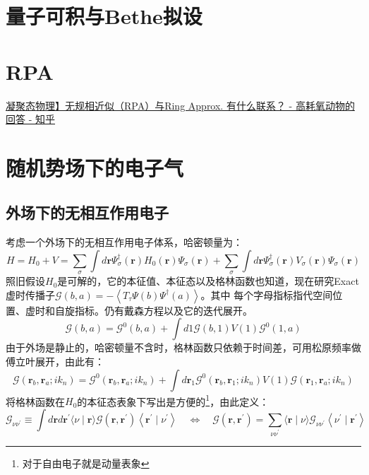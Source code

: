 \documentclass[10pt,openany]{book}
\theoremstyle{thmstyle} %
\theoremstyle{defstyle} %
\theoremstyle{prostyle} %
\begin{document}
\section{量子可积与Bethe拟设}

\section{RPA}
\href{https://www.zhihu.com/question/384993011/answer/3030775169}{凝聚态物理】无规相近似（RPA）与Ring Approx. 有什么联系？ - 高耗氧动物的回答 - 知乎}
\section{随机势场下的电子气}
\subsection*{外场下的无相互作用电子}
考虑一个外场下的无相互作用电子体系，哈密顿量为：
\begin{equation}
  H=H_0+V=\sum_\sigma \int d \mathbf{r} \Psi_\sigma^{\dagger}(\mathbf{r}) H_0(\mathbf{r}) \Psi_\sigma(\mathbf{r})+\sum_\sigma \int d \mathbf{r} \Psi_\sigma^{\dagger}(\mathbf{r}) V_\sigma(\mathbf{r}) \Psi_\sigma(\mathbf{r})
\end{equation}
照旧假设$ H_0 $是可解的，它的本征值、本征态以及格林函数也知道，现在研究Exact虚时传播子$ \mathcal{G}(b, a)=-\left\langle T_\tau \Psi(b) \Psi^{\dagger}(a)\right\rangle $。其中
每个字母指标指代空间位置、虚时和自旋指标。仍有戴森方程以及它的迭代展开。  
\begin{equation}
  \mathcal{G}(b, a)=\mathcal{G}^0(b, a)+\int d 1 \mathcal{G}(b, 1) V(1) \mathcal{G}^0(1, a)
  \label{Daysoneq}
\end{equation}
由于外场是静止的，哈密顿量不含时，格林函数只依赖于时间差，可用松原频率做傅立叶展开，由此有：
\begin{equation}
  \mathcal{G}\left(\mathbf{r}_b, \mathbf{r}_a ; i k_n\right)=\mathcal{G}^0\left(\mathbf{r}_b, \mathbf{r}_a ; i k_n\right)+\int d \mathbf{r}_1 \mathcal{G}^0\left(\mathbf{r}_b, \mathbf{r}_1 ; i k_n\right) V(1) \mathcal{G}\left(\mathbf{r}_1, \mathbf{r}_a ; i k_n\right)
\end{equation}
将格林函数在$ H_0 $的本征态表象下写出是方便的\footnote{对于自由电子就是动量表象}，由此定义：
\begin{equation}
  \mathcal{G}_{\nu \nu^{\prime}} \equiv \int d \mathbf{r} d \mathbf{r}^{\prime}\langle\nu \mid \mathbf{r}\rangle \mathcal{G}\left(\mathbf{r}, \mathbf{r}^{\prime}\right)\left\langle\mathbf{r}^{\prime} \mid \nu^{\prime}\right\rangle \quad \Leftrightarrow \quad \mathcal{G}\left(\mathbf{r}, \mathbf{r}^{\prime}\right)=\sum_{\nu \nu^{\prime}}\langle\mathbf{r} \mid \nu\rangle \mathcal{G}_{\nu \nu^{\prime}}\left\langle\nu^{\prime} \mid \mathbf{r}^{\prime}\right\rangle
\end{equation} 
\end{document}

